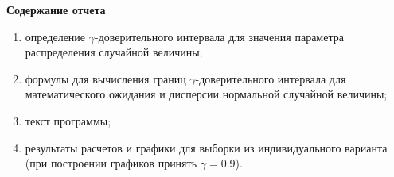 \textbf{Содержание отчета}

\begin{enumerate}[1.]
	\item определение $\gamma$-доверительного интервала для значения параметра распределения случайной величины;
	\item формулы для вычисления границ $\gamma$-доверительного интервала для математического ожидания и дисперсии нормальной случайной величины;
	\item текст программы;
	\item результаты расчетов и графики для выборки из индивидуального варианта (при построении графиков принять $\gamma = 0.9$).
\end{enumerate}
